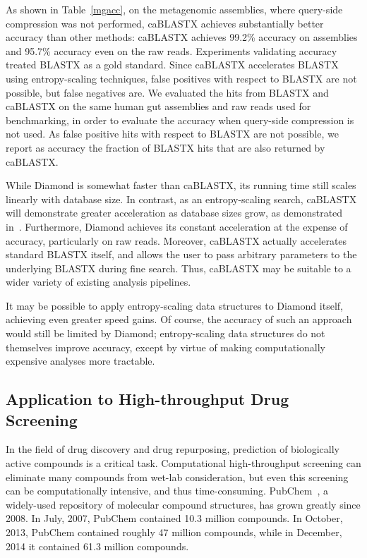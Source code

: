 \documentclass[review,preprint,12pt]{elsarticle}
\renewcommand{\cite}{\citep} %
\theoremstyle{definition}
\theoremstyle{remark}
\numberwithin{equation}{section}
\begin{document}
As shown in Table~\ref{mgacc}, on the metagenomic assemblies, where query-side 
compression was not performed, caBLASTX achieves substantially better accuracy
than other methods: caBLASTX achieves 99.2\% accuracy on assemblies and 95.7\% 
accuracy even on the raw reads.
Experiments validating accuracy treated BLASTX as a gold standard. 
Since caBLASTX accelerates BLASTX
using entropy-scaling techniques, false positives with respect to BLASTX are 
not possible, but false negatives are.
We evaluated the hits from BLASTX and caBLASTX on the same human gut
assemblies and raw reads used for benchmarking, in order to evaluate the accuracy when
query-side compression is not used.
As false positive hits with respect to BLASTX are not possible, we report as 
accuracy the fraction of BLASTX hits that are also returned by caBLASTX.


While Diamond is somewhat faster than caBLASTX, its running time still scales
linearly with database size.
In contrast, as an entropy-scaling search, caBLASTX will demonstrate greater
acceleration as database sizes grow, as demonstrated 
in~\citep{daniels2013compressive}.
Furthermore, Diamond achieves its constant acceleration at the expense of 
accuracy, particularly on raw reads.
Moreover, caBLASTX actually accelerates standard BLASTX itself, and allows the
user to pass arbitrary parameters to the underlying BLASTX during fine search.
Thus, caBLASTX may be suitable to a wider variety of existing analysis 
pipelines.

It may be possible to apply entropy-scaling data
structures to Diamond itself, achieving even greater speed gains.
Of course, the accuracy of such an approach would still be limited by Diamond; 
entropy-scaling data structures do not themselves improve accuracy,
except by virtue of making computationally expensive analyses more tractable.

\subsection{Application to High-throughput Drug Screening}

In the field of drug discovery and drug repurposing, prediction of biologically 
active compounds is a critical task. 
Computational high-throughput screening can eliminate many compounds from 
wet-lab consideration, but even this screening can be computationally 
intensive, and thus time-consuming.
PubChem~\cite{bolton2008pubchem}, a widely-used repository of molecular compound 
structures, 
has grown greatly since 2008. 
In July, 2007, PubChem contained 10.3 million compounds.
In October, 2013, PubChem contained roughly 47 million compounds, while
in December, 2014 it contained 61.3 million compounds.
\end{document}
